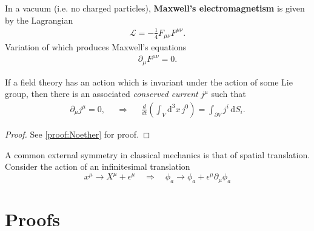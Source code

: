 \documentclass[12pt]{article}
\begin{document}
\begin{example}
	In a vacuum (i.e. no charged particles), \textbf{Maxwell's electromagnetism} is given by the Lagrangian
		\begin{align}
			\mathcal{L} = -\tfrac{1}{4} F_{\mu\nu} F^{\mu\nu}.
		\end{align}
	Variation of which produces Maxwell's equations
		\begin{align}
			\partial_\mu F^{\mu\nu} = 0.
		\end{align}
\end{example}

\begin{prop}\label{prop:Noether}
	If a field theory has an action which is invariant under the action of some Lie group, then there is an associated \textit{conserved current} $j^\mu$ such that
		\begin{align}
			\partial_\mu j^\mu = 0, && \Rightarrow && \frac{d}{dt} \left( \int_V \mathrm{d}^3 x \, j^0 \right) = \int_{\partial V} j^i \, \mathrm{d}S_i.
		\end{align}
\end{prop}
\begin{proof}
	See \cref{proof:Noether} for proof.
\end{proof}

\begin{example}
	A common external symmetry in classical mechanics is that of spatial translation. Consider the action of an infinitesimal translation
		\begin{equation}
		x^\mu \to X^\mu + \epsilon^\mu \quad \Rightarrow \quad \phi_a \to \phi_a + \epsilon^\mu \partial_\mu \phi_a
		\end{equation}
\end{example}


\pagebreak
\appendix
\section{Proofs}
\end{document}
